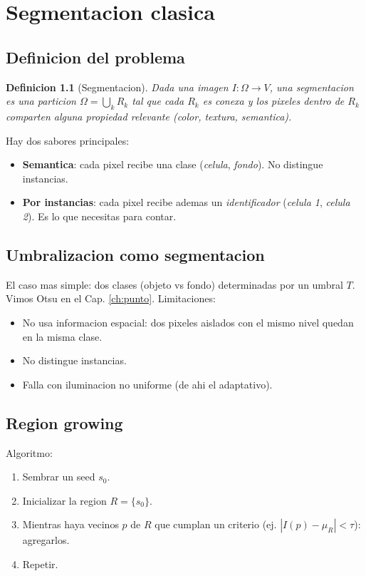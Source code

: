 \documentclass[11pt,a4paper,twoside,openright]{book}
\newtheorem{definicion}{Definicion}[chapter]
\begin{document}
\chapter{Segmentacion clasica}
\label{ch:seg-clasica}

\section{Definicion del problema}

\begin{definicion}[Segmentacion]
Dada una imagen $I: \Omega \to V$, una \emph{segmentacion} es una particion $\Omega = \bigcup_{k} R_k$ tal que cada $R_k$ es conexa y los pixeles dentro de $R_k$ comparten alguna propiedad relevante (color, textura, semantica).
\end{definicion}

Hay dos sabores principales:
\begin{itemize}[leftmargin=2em]
  \item \textbf{Semantica}: cada pixel recibe una clase (\emph{celula}, \emph{fondo}). No distingue instancias.
  \item \textbf{Por instancias}: cada pixel recibe ademas un \emph{identificador} (\emph{celula 1}, \emph{celula 2}). Es lo que necesitas para contar.
\end{itemize}

\section{Umbralizacion como segmentacion}

El caso mas simple: dos clases (objeto vs fondo) determinadas por un umbral $T$. Vimos Otsu en el Cap. \ref{ch:punto}. Limitaciones:
\begin{itemize}[leftmargin=2em]
  \item No usa informacion espacial: dos pixeles aislados con el mismo nivel quedan en la misma clase.
  \item No distingue instancias.
  \item Falla con iluminacion no uniforme (de ahi el adaptativo).
\end{itemize}

\section{Region growing}

Algoritmo:
\begin{enumerate}[leftmargin=2em]
  \item Sembrar un seed $s_0$.
  \item Inicializar la region $R = \{s_0\}$.
  \item Mientras haya vecinos $p$ de $R$ que cumplan un criterio (ej. $|I(p) - \mu_R| < \tau$): agregarlos.
  \item Repetir.
\end{enumerate}
\end{document}
